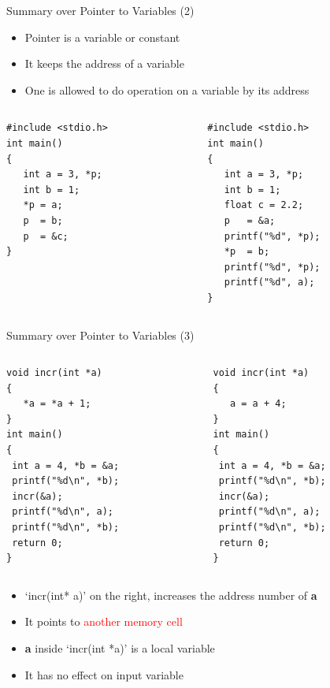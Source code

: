 \begin{frame}[fragile]{Summary over Pointer to Variables (2)}
\vspace{-0.15in}
\begin{itemize}
	\item {Pointer is a variable or constant}
    \item {It keeps the address of a variable}
    \item {One is allowed to do operation on a variable by its address}
\end{itemize}
\begin{columns}
\begin{column}{0.4\linewidth}
\begin{lstlisting}
#include <stdio.h>
int main()
{
   int a = 3, *p;
   int b = 1;
   *p = a;
   p  = b;
   p  = &c;
}
\end{lstlisting}
\end{column}
\begin{column}{0.45\linewidth}
\begin{lstlisting}
#include <stdio.h>
int main()
{
   int a = 3, *p;
   int b = 1;
   float c = 2.2;
   p   = &a;
   printf("%d", *p);
   *p  = b;
   printf("%d", *p);
   printf("%d", a);
}
\end{lstlisting}
\end{column}
\end{columns}
\end{frame}

\begin{frame}[fragile]{Summary over Pointer to Variables (3)}
\vspace{-0.15in}
\begin{columns}
\begin{column}{0.4\linewidth}
\begin{lstlisting}
void incr(int *a)
{
   *a = *a + 1;
}
int main()
{
 int a = 4, *b = &a;
 printf("%d\n", *b);
 incr(&a);
 printf("%d\n", a);
 printf("%d\n", *b);
 return 0;
}
\end{lstlisting}
\end{column}
\begin{column}{0.45\linewidth}
\begin{lstlisting}
void incr(int *a)
{
   a = a + 4;
}
int main()
{
 int a = 4, *b = &a;
 printf("%d\n", *b);
 incr(&a);
 printf("%d\n", a);
 printf("%d\n", *b);
 return 0;
}
\end{lstlisting}
\end{column}
\end{columns}
\begin{itemize}
	\item {`incr(int* a)' on the right, increases the address number of \textbf{a}}
    \item {It points to \textcolor{red}{another memory cell}}
    \item {\textbf{a} inside `incr(int *a)' is a local variable}
    \item {It has no effect on input variable}
\end{itemize}
\end{frame}

